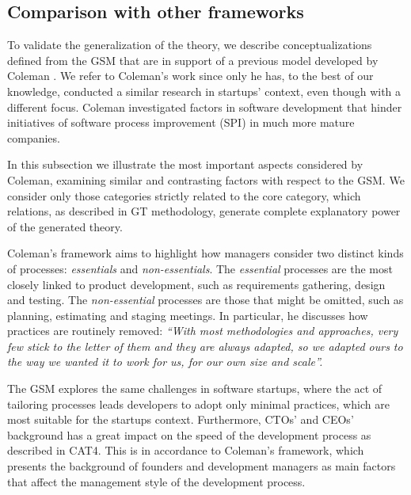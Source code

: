 \documentclass[10pt,journal,letterpaper,compsoc]{IEEEtran}
\begin{document}
\subsection{Comparison with other frameworks}
\label{sect:theory:validation:others}

To validate the generalization of the theory, we describe conceptualizations defined from the GSM that are in support of a previous model developed by Coleman \cite{Coleman2007,Coleman2008a, Coleman2008}. We refer to Coleman's work since only he has, to the best of our knowledge, conducted a similar research in startups' context, even though with a different focus. Coleman investigated factors in software development that hinder initiatives of software process improvement (SPI) in much more mature companies. %

In this subsection we illustrate the most important aspects considered by Coleman, examining similar and contrasting factors with respect to the GSM. We consider only those categories strictly related to the core category, which relations, as described in GT methodology, generate complete explanatory power of the generated theory. 

Coleman's framework aims to highlight how managers consider two distinct kinds of processes: \textit{essentials} and \textit{non-essentials}. The \textit{essential} processes are the most closely linked to product development, such as requirements gathering, design and testing. The \textit{non-essential} processes are those that might be omitted, such as planning, estimating and staging meetings. In particular, he discusses how practices are routinely removed: \textit{``With most methodologies and approaches, very few stick to the letter of them and they are always adapted, so we adapted ours to the way we wanted it to work for us, for our own size and scale''.}%

The GSM explores the same challenges in software startups, where the act of tailoring processes leads developers to adopt only minimal practices, which are most suitable for the startups context. Furthermore, CTOs' and CEOs' background has a great impact on the speed of the development process as described in CAT4. This is in accordance to Coleman's framework, which presents the background of founders and development managers as main factors that affect the management style of the development process.
\end{document}
